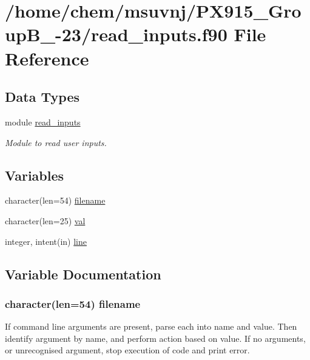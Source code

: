 \hypertarget{read__inputs_8f90}{\section{/home/chem/msuvnj/\-P\-X915\-\_\-\-Group\-B\-\_-\/23/read\-\_\-inputs.f90 File Reference}
\label{read__inputs_8f90}
}
\subsection*{Data Types}
\begin{DoxyCompactItemize}
\item 
module \hyperlink{classread__inputs}{read\-\_\-inputs}
\begin{DoxyCompactList}\small\item\em Module to read user inputs. \end{DoxyCompactList}\end{DoxyCompactItemize}
\subsection*{Variables}
\begin{DoxyCompactItemize}
\item 
character(len=54) \hyperlink{read__inputs_8f90_ad493c45aa771d875f6b10e91b6345de6}{filename}
\item 
character(len=25) \hyperlink{read__inputs_8f90_adc3f146dd63dc3a68f4024d9527d2583}{val}
\item 
integer, intent(in) \hyperlink{read__inputs_8f90_a1e765e78c796c355d042ac4da36118f1}{line}
\end{DoxyCompactItemize}


\subsection{Variable Documentation}
\hypertarget{read__inputs_8f90_ad493c45aa771d875f6b10e91b6345de6}{
\subsubsection[{filename}]{\setlength{\rightskip}{0pt plus 5cm}character(len=54) filename}}\label{read__inputs_8f90_ad493c45aa771d875f6b10e91b6345de6}
If command line arguments are present, parse each into name and value. Then identify argument by name, and perform action based on value. If no arguments, or unrecognised argument, stop execution of code and print error. 

